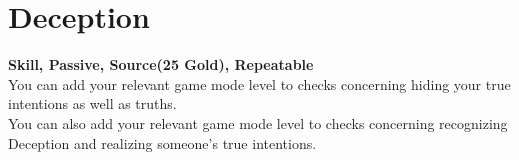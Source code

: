 \section{Deception}\label{sec:deception}
\textbf{Skill, Passive, Source(25 Gold), Repeatable}\\
You can add your relevant game mode level to checks concerning hiding your true intentions as well as truths.\\
You can also add your relevant game mode level to checks concerning recognizing Deception and realizing someone's true intentions.
